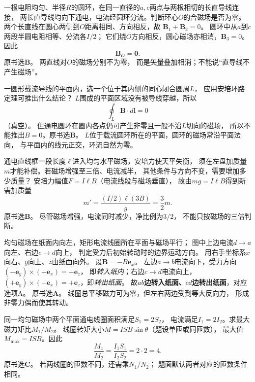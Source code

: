 \problemtext 一根电阻均匀、半径$R$的圆环，在同一直径的$a,c$两点与两根相切的长直导线连接，
两长直导线均向下通电，电流经圆环分流。判断环心$O$的合磁场是否为零。
\workings
两个长直线在圆心两侧到$O$距离相同、方向相反，故
$\bm B_1+\bm B_2=0$。
圆环中从$a$到$c$两段半圆电阻相等、分流各$I/2$；
它们绕$O$方向相反，圆心磁场亦相消，$\bm B_3=0$。
因此
\[
\boxed{\bm B_O=\bm0}.
\]
原书选\textbf{B}。
\crosscheck 两直线对$O$的磁场分别不为零，
而是矢量叠加相消；不能说“直导线不产生磁场”。

\problemtext 一圆形载流导线的平面内，选一个位于其内侧的同心闭合圆周$L$，
应用安培环路定理可推出什么结论？
\workings
$L$围成的平面区域没有被导线穿越，所以
\[
\boxed{\oint_L\bm B\cdot d\bm l=0}
\]
（真空）。
但通电圆环在圆内各点仍可产生非零且一般不沿$L$切向的磁场，
所以不能推出$B=0$。原书选\textbf{B}。
\crosscheck $L$位于载流圆环所在的平面，圆环的磁场常沿平面法向，
与平面内的线元正交，环流自然为零。

\problemtext 通电直线框一段长度$\ell$进入均匀水平磁场，安培力使天平失衡，
须在左盘加质量$m$才能补偿。若磁场增强至三倍、电流减半，
其他条件与方向不变，需要增加多少质量？
\workings
安培力幅值$F=I\ell B$（电流线段与磁场垂直），
故由$mg=I\ell B$得到新需加质量
\[
m'=\frac{(I/2)\ell(3B)}{g}=\boxed{\frac32m}.
\]
原书选\textbf{B}。
\crosscheck 尽管磁场增强，电流同时减少，净比例为$3/2$，
不能只按磁场的三倍判断。

\problemtext 均匀磁场在纸面内向左，矩形电流线圈所在平面与磁场平行；
图中上边电流$d\to a$向左、右边$c\to d$向上，
判定受力后初始转动时的边界运动方向。
\workings
用右手坐标系$x$向右、$y$向上、$z$由纸面向外。
设$\bm B=-B\bm e_x$。
左边$a\to b$电流向下，受力方向
$(-\bm e_y)\times(-\bm e_x)=-\bm e_z$，
即\emph{转入纸内}；右边$c\to d$电流向上，
$(+\bm e_y)\times(-\bm e_x)=+\bm e_z$，即\emph{转出纸面}。
故\textbf{$ab$边转入纸面、$cd$边转出纸面}，对应选项A。
原书选\textbf{A}。
\crosscheck 线圈总平移磁力可为零，但左右两边受到等大反向力，
形成非零力偶而使其转动。

\problemtext 同一均匀磁场中两个平面通电线圈面积满足$S_1=2S_2$，
电流满足$I_1=2I_2$。求最大磁力矩比$M_1/M_2$。
\workings
线圈转矩大小$M=ISB\sin\theta$（题设单匝或同匝数），
最大值$M_{\max}=ISB$。因此
\[
\boxed{\frac{M_1}{M_2}=\frac{I_1S_1}{I_2S_2}=2\cdot2=4}.
\]
原书选\textbf{C}。
\crosscheck 若两线圈的匝数不同，还需乘$N_1/N_2$；
题面默认两者对应的匝数条件相同。

